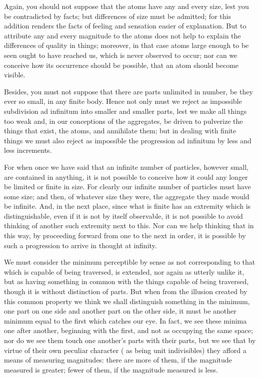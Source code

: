 \documentclass{stex}
\begin{document}
Again, you should not suppose that the atoms have any and every size, lest you be contradicted by facts; but differences of size must be admitted; for this addition renders the facts of feeling and sensation easier of explanation.
But to attribute any and every magnitude to the atoms does not help to explain the differences of quality in things; moreover, in that case atoms large enough to be seen ought to have reached us, which is never observed to occur; nor can we conceive how its occurrence should be possible, \idEst{} that an atom should become visible.

Besides, you must not suppose that there are parts unlimited in number, be they ever so small, in any finite body.
Hence not only must we reject as impossible subdivision \foreignlanguage{latin}{ad infinitum} into smaller and smaller parts, lest we make all things too weak and, in our conceptions of the aggregates, be driven to pulverize the things that exist, \idEst{} the atoms, and annihilate them; but in dealing with finite things we must also reject as impossible the progression \foreignlanguage{latin}{ad infinitum} by less and less increments.

For when once we have said that an infinite number of particles, however small, are contained in anything, it is not possible to conceive how it could any longer be limited or finite in size.
For clearly our infinite number of particles must have some size; and then, of whatever size they were, the aggregate they made would be infinite.
And, in the next place, since what is finite has an extremity which is distinguishable, even if it is not by itself observable, it is not possible to avoid thinking of another such extremity next to this.
Nor can we help thinking that in this way, by proceeding forward from one to the next in order, it is possible by such a progression to arrive in thought at infinity.

We must consider the minimum perceptible by sense as not corresponding to that which is capable of being traversed, \idEst{} is extended, nor again as utterly unlike it, but as having something in common with the things capable of being traversed, though it is without distinction of parts.
But when from the illusion created by this common property we think we shall distinguish something in the minimum, one part on one side and another part on the other side, it must be another minimum equal to the first which catches our eye.
In fact, we see these minima one after another, beginning with the first, and not as occupying the same space; nor do we see them touch one another's parts with their parts, but we see that by virtue of their own peculiar character (\idEst{} as being unit indivisibles) they afford a means of measuring magnitudes: there are more of them, if the magnitude measured is greater; fewer of them, if the magnitude measured is less.
\end{document}
